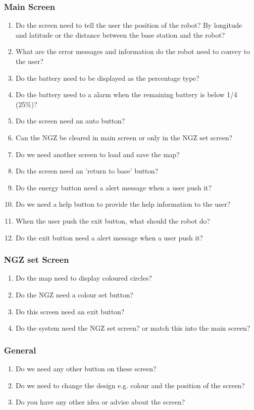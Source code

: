 \documentclass[a4paper] {article}
\begin{document}
	\subsubsection{Main Screen}
	\begin{enumerate}
	        \item Do the screen need to tell the user the position of the robot? By longitude and latitude or the distance between the base station and the robot?
	        \item What are the error messages and information do the robot need to convey to the user?
	        \item Do the battery need to be displayed as the percentage type?
	        \item Do the battery need to a alarm when the remaining battery is below 1/4 (25\%)?
	        \item Do the screen need an auto button?
	        \item Can the NGZ be cleared in main screen or only in the NGZ set screen?
			\item Do we need another screen to load and save the map?
			\item Do the screen need an ’return to base’ button?
			\item Do the energy button need a alert message when a user push it?
			\item Do we need a help button to provide the help information to the user?
			\item When the user push the exit button, what should the robot do?
			\item Do the exit button need a alert message when a user push it?
   \end{enumerate}
   
	\subsubsection{NGZ set Screen}
	\begin{enumerate}
	        \item Do the map need to display coloured circles?
	        \item Do the NGZ need a colour set button?
	        \item Do this screen need an exit button?
	        \item Do the system need the NGZ set screen? or match this into the main screen?
   \end{enumerate}
   
	\subsubsection{General}
	\begin{enumerate}
	        \item Do we need any other button on these screen?
	        \item Do we need to change the design e.g. colour and the position of the screen?
	        \item Do you have any other idea or advise about the screen?
   \end{enumerate}
   
\end{document}
